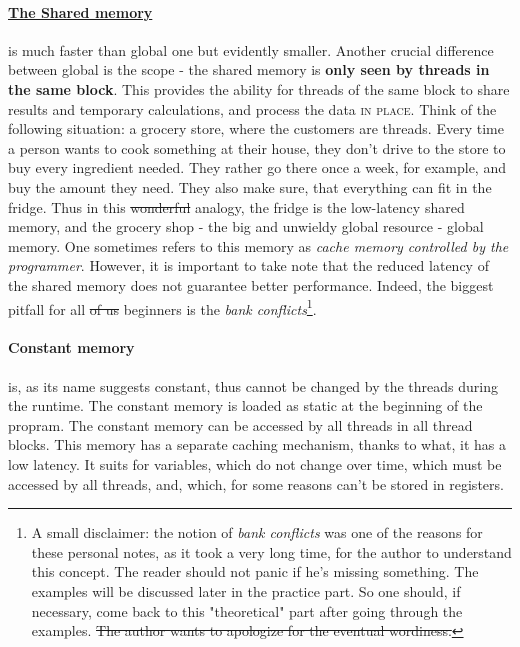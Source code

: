 \paragraph{\underline{The Shared memory}} \label{grocery_store} is much faster than global one but evidently smaller. Another 
crucial difference between global is the scope - the shared memory is \textbf{only seen by threads in the same block}. This provides 
the ability for threads of the same block to share results and temporary calculations, and process the data \textsc{in place}. 
Think of the following situation: a grocery store, where the customers are threads. Every time a person 
wants to cook something at their house, they don't drive to the store to buy every ingredient needed. They rather go there 
once a week, for example, and buy the amount they need. They also make sure, 
that everything can fit in the fridge. Thus 
in this \sout{wonderful} analogy, the fridge is the low-latency shared memory, and the grocery shop - the 
big and unwieldy global resource - global memory.
One sometimes refers to this memory as 
\textsl{cache memory controlled by the programmer}. However, it is important to take note that the reduced 
latency of the shared memory does not guarantee better performance. Indeed, the biggest pitfall for all \sout{of us} beginners 
is the \textit{bank conflicts}\footnote{A small disclaimer: the notion of \textit{bank conflicts} was one of the reasons for these personal 
notes, as it took a very long time, for the author to understand this concept. The reader should not panic if he's missing something. The examples will be discussed later in the practice part. So one 
should, if necessary, come back to this "theoretical" part after going through the examples. \sout{The author wants to apologize 
for the eventual wordiness.}}. 

\vspace{-0.5cm}
\paragraph{Constant memory} is, as its name suggests constant, thus cannot be changed by the threads during 
the runtime. The constant memory is loaded as static at the beginning of the propram. The constant memory can be 
accessed by all threads in all thread blocks. This memory has a separate caching mechanism, thanks to what, it has 
a low latency. It suits for variables, which do not change over time, which must be accessed by all threads, and, which, 
for some reasons can't be stored in registers.

